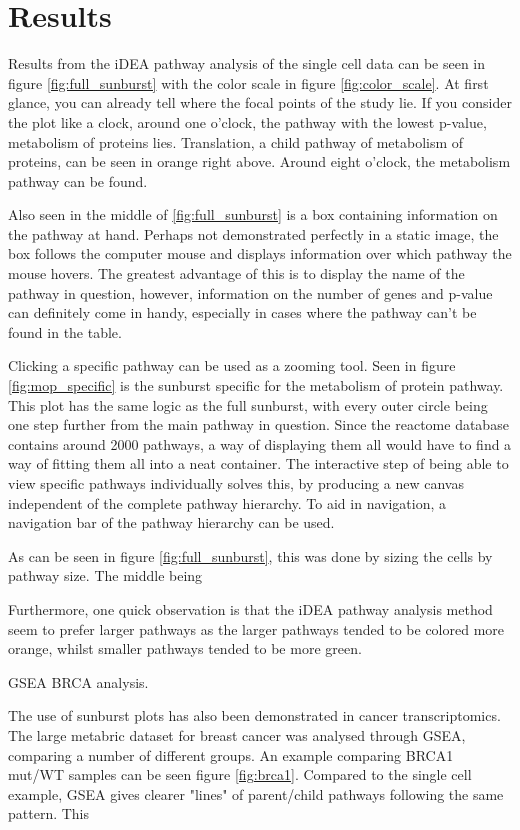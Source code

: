 \documentclass[11pt]{article}
\begin{document}
\section*{Results}

  Results from the iDEA pathway analysis of the single cell data can be seen in figure \ref{fig:full_sunburst} with the color scale in figure \ref{fig:color_scale}. At first glance, you can already tell where the focal points of the study lie. If you consider the plot like a clock, around one o'clock, the pathway with the lowest p-value, metabolism of proteins \cite{reactome} lies. Translation, a child pathway of metabolism of proteins, can be seen in orange right above. Around eight o'clock, the metabolism pathway can be found.

  Also seen in the middle of \ref{fig:full_sunburst} is a box containing information on the pathway at hand. Perhaps not demonstrated perfectly in a static image, the box follows the computer mouse and displays information over which pathway the mouse hovers. The greatest advantage of this is to display the name of the pathway in question, however, information on the number of genes and p-value can definitely come in handy, especially in cases where the pathway can't be found in the table.

  Clicking a specific pathway can be used as a zooming tool. Seen in figure \ref{fig:mop_specific} is the sunburst specific for the metabolism of protein pathway. This plot has the same logic as the full sunburst, with every outer circle being one step further from the main pathway in question. Since the reactome database contains around 2000 pathways, a way of displaying them all would have to find a way of fitting them all into a neat container. The interactive step of being able to view specific pathways individually solves this, by producing a new canvas independent of the complete pathway hierarchy. To aid in navigation, a navigation bar of the pathway hierarchy can be used.

  As can be seen in figure \ref{fig:full_sunburst}, this was done by sizing the cells by pathway size. The middle being

  Furthermore, one quick observation is that the iDEA pathway analysis method seem to prefer larger pathways as the larger pathways tended to be colored more orange, whilst smaller pathways tended to be more green.

  GSEA BRCA analysis.

  The use of sunburst plots has also been demonstrated in cancer transcriptomics. The large metabric dataset for breast cancer was analysed through GSEA, comparing a number of different groups. An example comparing BRCA1 mut/WT samples can be seen figure \ref{fig:brca1}. Compared to the single cell example, GSEA gives clearer "lines" of parent/child pathways following the same pattern. This
\end{document}
